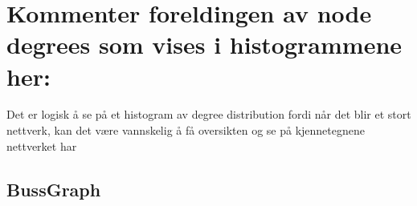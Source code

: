 \documentclass[11pt]{article}
\begin{document}
    \begin{center}
    \end{center}
    { \hspace*{\fill} \\}
    
    \begin{center}
    \end{center}
    { \hspace*{\fill} \\}
    
    \begin{center}
    \end{center}
    { \hspace*{\fill} \\}
    
    \begin{center}
    \end{center}
    { \hspace*{\fill} \\}
    
    \begin{center}
    \end{center}
    { \hspace*{\fill} \\}
    
    \hypertarget{kommenter-foreldingen-av-node-degrees-som-vises-i-histogrammene-her}{%
\section*{Kommenter foreldingen av node degrees som vises i histogrammene
her:}\label{kommenter-foreldingen-av-node-degrees-som-vises-i-histogrammene-her}}

Det er logisk å se på et histogram av degree distribution fordi når det
blir et stort nettverk, kan det være vannskelig å få oversikten og se på
kjennetegnene nettverket har

\hypertarget{bussgraph}{%
\subsection*{BussGraph}\label{bussgraph}}
\end{document}

